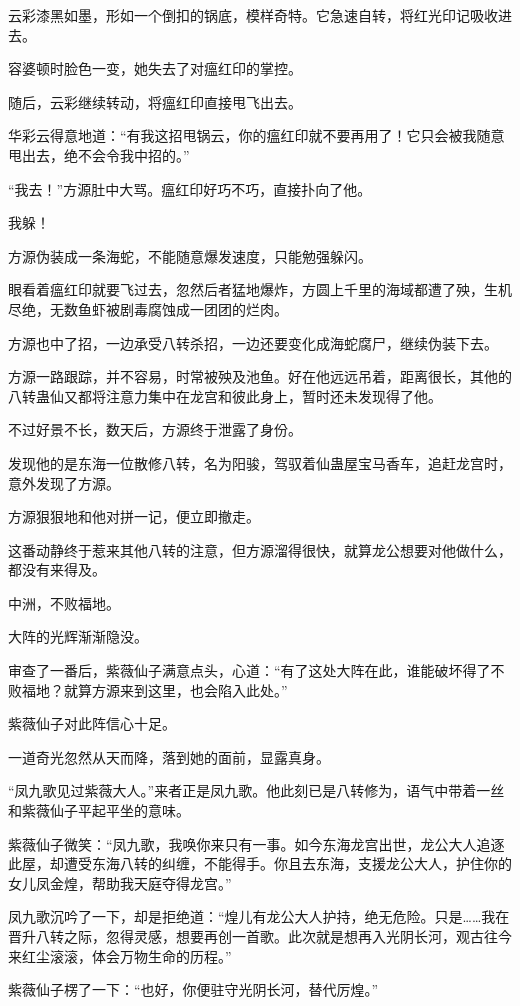 \begin{this_body}
云彩漆黑如墨，形如一个倒扣的锅底，模样奇特。它急速自转，将红光印记吸收进去。

容婆顿时脸色一变，她失去了对瘟红印的掌控。

随后，云彩继续转动，将瘟红印直接甩飞出去。

华彩云得意地道：“有我这招甩锅云，你的瘟红印就不要再用了！它只会被我随意甩出去，绝不会令我中招的。”

“我去！”方源肚中大骂。瘟红印好巧不巧，直接扑向了他。

我躲！

方源伪装成一条海蛇，不能随意爆发速度，只能勉强躲闪。

眼看着瘟红印就要飞过去，忽然后者猛地爆炸，方圆上千里的海域都遭了殃，生机尽绝，无数鱼虾被剧毒腐蚀成一团团的烂肉。

方源也中了招，一边承受八转杀招，一边还要变化成海蛇腐尸，继续伪装下去。

方源一路跟踪，并不容易，时常被殃及池鱼。好在他远远吊着，距离很长，其他的八转蛊仙又都将注意力集中在龙宫和彼此身上，暂时还未发现得了他。

不过好景不长，数天后，方源终于泄露了身份。

发现他的是东海一位散修八转，名为阳骏，驾驭着仙蛊屋宝马香车，追赶龙宫时，意外发现了方源。

方源狠狠地和他对拼一记，便立即撤走。

这番动静终于惹来其他八转的注意，但方源溜得很快，就算龙公想要对他做什么，都没有来得及。

中洲，不败福地。

大阵的光辉渐渐隐没。

审查了一番后，紫薇仙子满意点头，心道：“有了这处大阵在此，谁能破坏得了不败福地？就算方源来到这里，也会陷入此处。”

紫薇仙子对此阵信心十足。

一道奇光忽然从天而降，落到她的面前，显露真身。

“凤九歌见过紫薇大人。”来者正是凤九歌。他此刻已是八转修为，语气中带着一丝和紫薇仙子平起平坐的意味。

紫薇仙子微笑：“凤九歌，我唤你来只有一事。如今东海龙宫出世，龙公大人追逐此屋，却遭受东海八转的纠缠，不能得手。你且去东海，支援龙公大人，护住你的女儿凤金煌，帮助我天庭夺得龙宫。”

凤九歌沉吟了一下，却是拒绝道：“煌儿有龙公大人护持，绝无危险。只是……我在晋升八转之际，忽得灵感，想要再创一首歌。此次就是想再入光阴长河，观古往今来红尘滚滚，体会万物生命的历程。”

紫薇仙子楞了一下：“也好，你便驻守光阴长河，替代厉煌。”

\end{this_body}

